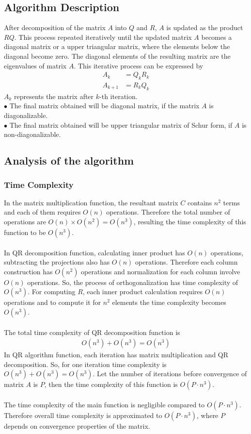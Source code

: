 \documentclass[12pt,a4paper]{article}
\begin{document}
\subsection{Algorithm Description}
After decomposition of the matrix $A$ into $Q$ and $R$, $A$ is updated as the product $RQ$. This process repeated iteratively until the updated matrix $A$ becomes a diagonal matrix or a upper triangular matrix, where the elements below the diagonal become zero. The diagonal elements of the resulting matrix are the eigenvalues of matrix $A$. This iterative process can be expressed by
\begin{align*}
    A_k & = Q_kR_k \\
    A_{k+1} & = R_kQ_k
\end{align*}
$A_k$ represents the matrix after $k$-th iteration.\\
$\bullet$ The final matrix obtained will be diagonal matrix, if the matrix $A$ is diagonalizable.\\
$\bullet$ The final matrix obtained will be upper triangular matrix of Schur form, if $A$ is non-diagonalizable. 
\subsection{Analysis of the algorithm}
\subsubsection{Time Complexity}
In the matrix multiplication function, the resultant matrix $C$ contains $n^2$ terms and each of them requires $O(n)$ operations. Therefore the total number of operations are $O(n) \times O(n^2) = O(n^3)$, resulting the time complexity of this function to be $O(n^3)$.\\\\
In QR decomposition function, calculating inner product has $O(n)$ operations, subtracting the projections also has $O(n)$ operations. Therefore each column construction has $O(n^2)$ operations and normalization for each column involve $O(n)$ operations. So, the process of orthogonalization has time complexity of $O(n^3)$. For computing $R$, each inner product calculation requires $O(n)$ operations and to compute it for $n^2$ elements the time complexity becomes $O(n^3)$.\\\\
The total time complexity of QR decomposition function is
\begin{align*}
    O(n^3) + O(n^3) = O(n^3)
\end{align*}
In QR algorithm function, each iteration has matrix multiplication and QR decomposition. So, for one iteration time complexity is $O(n^3) + O(n^3) = O(n^3)$. Let the number of iterations before convergence of matrix $A$ is $P$, then the time complexity of this function is $O(P \cdot n^3)$.\\\\
The time complexity of the main function is negligible compared to $O(P \cdot n^3)$. Therefore overall time complexity is approximated to $O(P \cdot n^3)$, where $P$ depends on convergence properties of the matrix.
\end{document}
